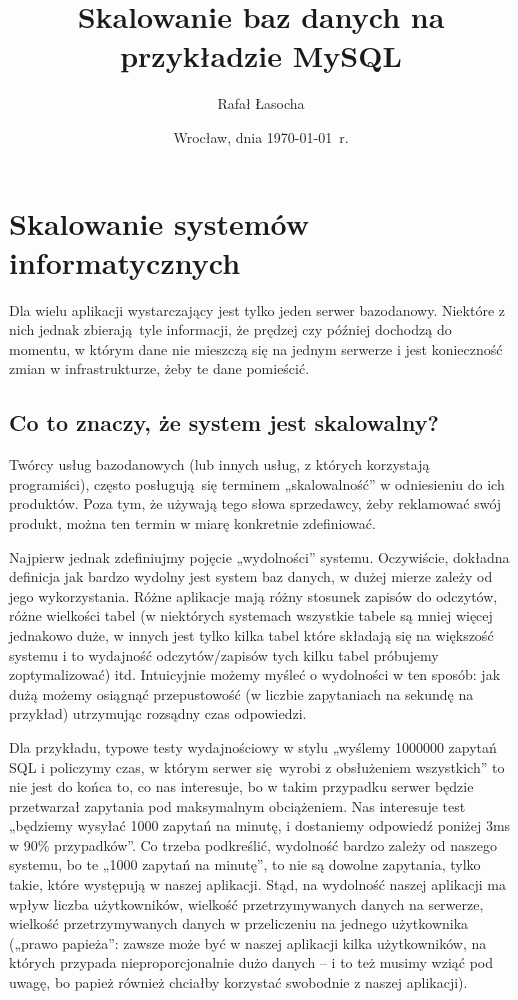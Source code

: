 \documentclass[a4paper,12pt]{article}
\title{{\textbf{Skalowanie baz danych na przykładzie MySQL}}}
\author{Rafał Łasocha}
\date{Wrocław, dnia \today\ r.}
\begin{document}
\maketitle

\section{Skalowanie systemów informatycznych}

Dla wielu aplikacji wystarczający jest tylko jeden serwer bazodanowy. Niektóre z nich jednak zbierają tyle informacji, że prędzej czy później dochodzą do momentu, w którym dane nie mieszczą się na jednym serwerze i jest konieczność zmian w infrastrukturze, żeby te dane pomieścić.

\subsection{Co to znaczy, że system jest skalowalny?}

Twórcy usług bazodanowych (lub innych usług, z których korzystają programiści), często posługują się terminem „skalowalność” w odniesieniu do ich produktów. Poza tym, że używają tego słowa sprzedawcy, żeby reklamować swój produkt, można ten termin w miarę konkretnie zdefiniować. 

Najpierw jednak zdefiniujmy pojęcie „wydolności” systemu. Oczywiście, dokładna definicja jak bardzo wydolny jest system baz danych, w dużej mierze zależy od jego wykorzystania.  Różne aplikacje mają różny stosunek zapisów do odczytów, różne wielkości tabel (w niektórych systemach wszystkie tabele są mniej więcej jednakowo duże, w innych jest tylko kilka tabel które składają się na większość systemu i to wydajność odczytów/zapisów tych kilku tabel próbujemy zoptymalizować) itd. Intuicyjnie możemy myśleć o wydolności w ten sposób: jak dużą możemy osiągnąć przepustowość (w liczbie zapytaniach na sekundę na przykład) utrzymując rozsądny czas odpowiedzi.

Dla przykładu, typowe testy wydajnościowy w stylu „wyślemy 1000000 zapytań SQL i policzymy czas, w którym serwer się wyrobi z obsłużeniem wszystkich” to nie jest do końca to, co nas interesuje, bo w takim przypadku serwer będzie przetwarzał zapytania pod maksymalnym obciążeniem. Nas interesuje test „będziemy wysyłać 1000 zapytań na minutę, i dostaniemy odpowiedź poniżej 3ms w 90\% przypadków”. Co trzeba podkreślić, wydolność bardzo zależy od naszego systemu, bo te „1000 zapytań na minutę”, to nie są dowolne zapytania, tylko takie, które występują w naszej aplikacji. Stąd, na wydolność naszej aplikacji ma wpływ liczba użytkowników, wielkość przetrzymywanych danych na serwerze, wielkość przetrzymywanych danych w przeliczeniu na jednego użytkownika („prawo papieża”: zawsze może być w naszej aplikacji kilka użytkowników, na których przypada nieproporcjonalnie dużo danych – i to też musimy wziąć pod uwagę, bo papież również chciałby korzystać swobodnie z naszej aplikacji).
\end{document}
